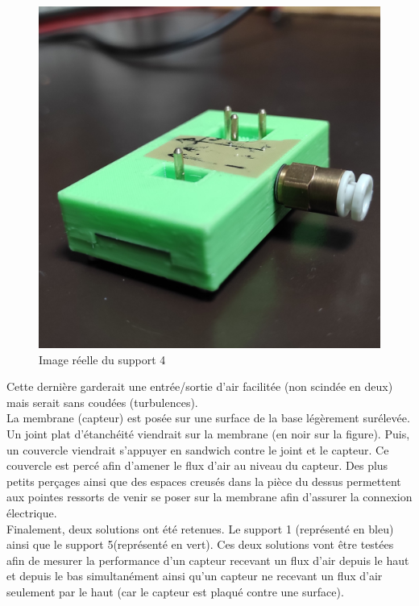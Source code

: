 \begin{figure}[H]
    \centering
    \includegraphics[scale = 0.05]{assets/figures/Green_real.jpg}
    \caption{Image réelle du support 4}
\end{figure}

Cette dernière garderait une entrée/sortie d'air facilitée (non scindée en deux) mais serait sans coudées (turbulences).\\
La membrane (capteur) est posée sur une surface de la base légèrement surélevée. Un joint plat d'étanchéité viendrait sur la membrane (en noir
sur la figure). Puis, un couvercle viendrait s'appuyer en sandwich contre le joint et le capteur. Ce couvercle est percé afin d'amener le flux 
d'air au niveau du capteur. Des plus petits perçages ainsi que des espaces creusés dans la pièce du dessus permettent aux pointes ressorts de 
venir se poser sur la membrane afin d'assurer la connexion électrique.\\

Finalement, deux solutions ont été retenues. Le support 1 (représenté en bleu) ainsi que le support 5(représenté en vert). Ces deux solutions vont être testées afin de mesurer la
performance d'un capteur recevant un flux d'air depuis le haut et depuis le bas simultanément ainsi qu'un capteur ne recevant un flux
d'air seulement par le haut (car le capteur est plaqué contre une surface).